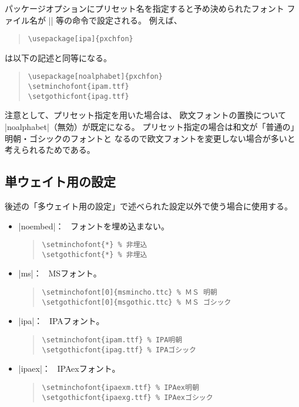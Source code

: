 \documentclass[a4paper,uplatex]{jsarticle}
\newcommand{\Means}{：\ }
\begin{document}
パッケージオプションにプリセット名を指定すると予め決められたフォント
ファイル名が |\setminchofont| 等の命令で設定される。
例えば、
\begin{quote}\small\begin{verbatim}
\usepackage[ipa]{pxchfon}
\end{verbatim}\end{quote}
は以下の記述と同等になる。
\begin{quote}\small\begin{verbatim}
\usepackage[noalphabet]{pxchfon}
\setminchofont{ipam.ttf}
\setgothicfont{ipag.ttf}
\end{verbatim}\end{quote}

注意として、プリセット指定を用いた場合は、
欧文フォントの置換について |noalphabet|（無効）が既定になる。
プリセット指定の場合は和文が「普通の」明朝・ゴシックのフォントと
なるので欧文フォントを変更しない場合が多いと考えられるためである。

\subsection{単ウェイト用の設定}

後述の「多ウェイト用の設定」で述べられた設定以外で使う場合に使用する。

\begin{itemize}
\item |noembed|\Means
  フォントを埋め込まない。
\begin{quote}\small\begin{verbatim}
\setminchofont{*} % 非埋込
\setgothicfont{*} % 非埋込
\end{verbatim}\end{quote}

\item |ms|\Means
  MSフォント。
\begin{quote}\small\begin{verbatim}
\setminchofont[0]{msmincho.ttc} % ＭＳ 明朝
\setgothicfont[0]{msgothic.ttc} % ＭＳ ゴシック
\end{verbatim}\end{quote}

\item |ipa|\Means
  IPAフォント。
\begin{quote}\small\begin{verbatim}
\setminchofont{ipam.ttf} % IPA明朝
\setgothicfont{ipag.ttf} % IPAゴシック
\end{verbatim}\end{quote}

\item |ipaex|\Means
  IPAexフォント。
\begin{quote}\small\begin{verbatim}
\setminchofont{ipaexm.ttf} % IPAex明朝
\setgothicfont{ipaexg.ttf} % IPAexゴシック
\end{verbatim}\end{quote}
\end{itemize}
\end{document}

